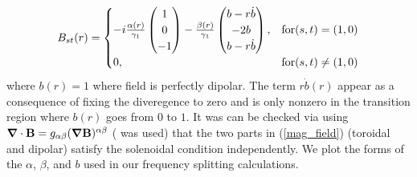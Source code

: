 \begin{equation}\label{mag_field}
B_{st}(r) = 
\begin{cases}
-i \frac{\alpha(r)}{\gamma_{1}} \left(\begin{matrix} 1 \\ 0 \\ -1 \end{matrix}\right)  - \frac{\beta(r)}{\gamma_{1}} \left(\begin{matrix} b-r\dot{b} \\ -2b \\ b-r\dot{b} \end{matrix}\right), & \text{for} (s,t) = (1,0) \\
0, & \text{for} (s,t) \neq (1,0)
\end{cases}
\end{equation}
where $b(r)=1$ where field is perfectly dipolar. The term $r\dot{b}(r)$ appear as a consequence of fixing the diveregence to zero and is only nonzero in the transition region where $b(r)$ goes from $0$ to $1$. It was can be checked via using $\bm{\nabla} \cdot \mathbf{B} = g_{\alpha\beta} (\bm{\nabla}\mathbf{B})^{\alpha\beta}$ (\cite{GSH_repo} was used) that the two parts in (\ref{mag_field}) (toroidal and dipolar) satisfy the solenoidal condition independently. We plot the forms of the $\alpha$, $\beta$, and $b$ used in our frequency splitting calculations.

